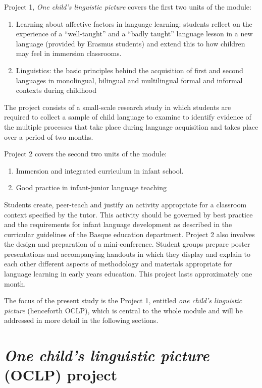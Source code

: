 \documentclass[output=paper]{../langscibook}
\begin{document}
Project 1, \emph{One child's linguistic picture} covers the first two units of the module:

\begin{enumerate}
\item Learning about affective factors in language learning: students reflect on the experience of a “well-taught” and a “badly taught” language lesson in a new language (provided by Erasmus students) and extend this to how children may feel in immersion classrooms.
\item Linguistics: the basic principles behind the acquisition of first and second languages in monolingual, bilingual and multilingual formal and informal contexts during childhood 
\end{enumerate}

The project consists of a small-scale research study in which students are required to collect a sample of child language to examine to identify evidence of the multiple processes that take place during language acquisition and takes place over a period of two months.

Project 2 covers the second two units of the module: 

\begin{enumerate}[start=3]
\item Immersion and integrated curriculum in infant school. 
\item Good practice in infant-junior language teaching
\end{enumerate}

Students create, peer-teach and justify an activity appropriate for a classroom context specified by the tutor. This activity should be governed by best practice and the requirements for infant language development as described in the curricular guidelines of the Basque education department. Project 2 also involves the design and preparation of a mini-conference. Student groups prepare poster presentations and accompanying handouts in which they display and explain to each other different aspects of methodology and materials appropriate for language learning in early years education. This project lasts approximately one month.

The focus of the present study is the Project 1, entitled \emph{one child's linguistic picture} (henceforth OCLP), which is central to the whole module and will be addressed in more detail in the following sections.


\section{\emph{One child's linguistic picture} (OCLP) project}
\end{document}
